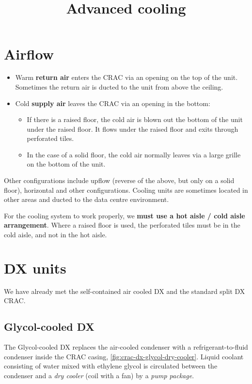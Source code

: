 \documentclass{pgnotes}
\title{Advanced cooling}
\begin{document}
\maketitle

\section{Airflow}

\begin{itemize}
\item Warm \textbf{return air} enters the CRAC via an opening on the top of the unit.
  Sometimes the return air is ducted to the unit from above the ceiling.
\item Cold \textbf{supply air} leaves the CRAC via an opening in the bottom:
  \begin{itemize}
  \item If there is a raised floor, the cold air is blown out the bottom of the unit under the raised floor.
    It flows under the raised floor and exits through perforated tiles.
  \item In the case of a solid floor, the cold air normally leaves via a large grille on the bottom of the unit.
  \end{itemize}
\end{itemize}
Other configurations include upflow (reverse of the above, but only on a solid floor), horizontal and other configurations.
Cooling units are sometimes located in other areas and ducted to the data centre environment.

For the cooling system to work properly, we \textbf{must use a hot aisle / cold aisle arrangement}.
Where a raised floor is used, the perforated tiles must be in the cold aisle, and not in the hot aisle.

\section{DX units}

We have already met the self-contained air cooled DX and the standard split DX CRAC.

\newpage
\subsection{Glycol-cooled DX}

The Glycol-cooled DX replaces the air-cooled condenser with a refrigerant-to-fluid condenser inside the CRAC casing, \autoref{fig:crac-dx-glycol-dry-cooler}.
Liquid coolant consisting of water mixed with ethylene glycol is circulated between the condenser and a \textit{dry cooler} (coil with a fan) by a \textit{pump package}.
\end{document}
